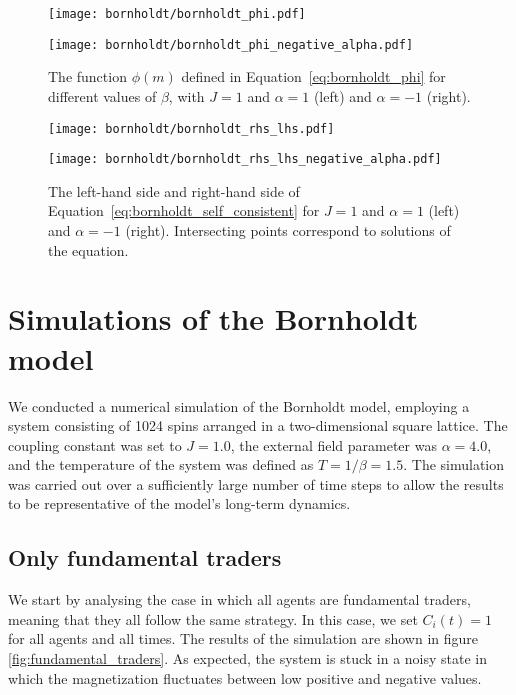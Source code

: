 \begin{figure}[h]
    \centering
    \begin{minipage}[t]{0.45\textwidth}
        \centering
        \texttt{[image: bornholdt/bornholdt\_phi.pdf]}
    \end{minipage}
    \hfill
    \begin{minipage}[t]{0.45\textwidth}
        \centering
        \texttt{[image: bornholdt/bornholdt\_phi\_negative\_alpha.pdf]}
    \end{minipage}
    \caption{The function $\phi(m)$ defined in Equation~\ref{eq:bornholdt_phi} for different values of $\beta$, with $J=1$ and $\alpha=1$ (left) and $\alpha=-1$ (right).}
    \label{fig:bornholdt_phi}
\end{figure}

\begin{figure}[h]
    \centering
    \begin{minipage}[t]{0.45\textwidth}
        \centering
        \texttt{[image: bornholdt/bornholdt\_rhs\_lhs.pdf]}

    \end{minipage}
    \hfill
    \begin{minipage}[t]{0.45\textwidth}
        \centering
        \texttt{[image: bornholdt/bornholdt\_rhs\_lhs\_negative\_alpha.pdf]}
    \end{minipage}
    \caption{The left-hand side and right-hand side of Equation~\ref{eq:bornholdt_self_consistent} for $J=1$ and $\alpha=1$ (left) and $\alpha=-1$ (right). Intersecting points correspond to solutions of the equation.}
    \label{fig:bornholdt_rhs_lhs}
\end{figure}

\section{Simulations of the Bornholdt model}
We conducted a numerical simulation of the Bornholdt model, employing a system consisting of 1024 spins arranged in a two-dimensional square lattice. The coupling constant was set to $J=1.0$, the external field parameter was $\alpha=4.0$, and the temperature of the system was defined as $T=1/\beta=1.5$. The simulation was carried out over a sufficiently large number of time steps to allow the results to be representative of the model's long-term dynamics.

\subsection{Only fundamental traders}
We start by analysing the case in which all agents are fundamental traders, meaning that they all follow the same strategy. In this case, we set $C_i(t) = 1$ for all agents and all times. The results of the simulation are shown in figure \ref{fig:fundamental_traders}. As expected, the system is stuck in a noisy state in which the magnetization fluctuates between low positive and negative values.

